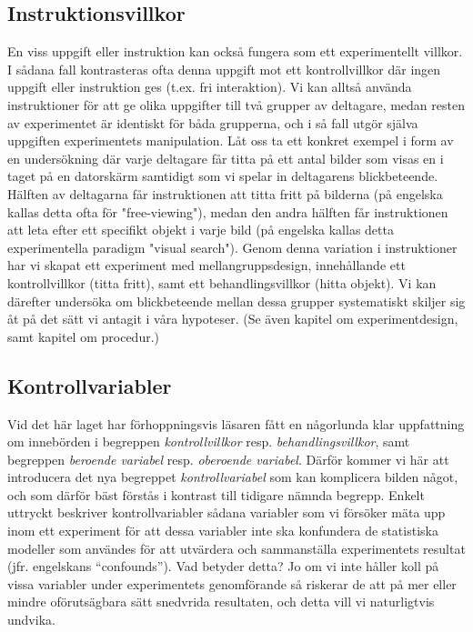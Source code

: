 \documentclass[
]{book}
\begin{document}
\hypertarget{sub07.4.3}{%
\subsection{Instruktionsvillkor}\label{sub07.4.3}}

En viss uppgift eller instruktion kan också fungera som ett experimentellt villkor. I sådana fall kontrasteras ofta denna uppgift mot ett kontrollvillkor där ingen uppgift eller instruktion ges (t.ex. fri interaktion). Vi kan alltså använda instruktioner för att ge olika uppgifter till två grupper av deltagare, medan resten av experimentet är identiskt för båda grupperna, och i så fall utgör själva uppgiften experimentets manipulation. Låt oss ta ett konkret exempel i form av en undersökning där varje deltagare får titta på ett antal bilder som visas en i taget på en datorskärm samtidigt som vi spelar in deltagarens blickbeteende. Hälften av deltagarna får instruktionen att titta fritt på bilderna (på engelska kallas detta ofta för "free-viewing"), medan den andra hälften får instruktionen att leta efter ett specifikt objekt i varje bild (på engelska kallas detta experimentella paradigm "visual search"). Genom denna variation i instruktioner har vi skapat ett experiment med mellangruppsdesign, innehållande ett kontrollvillkor (titta fritt), samt ett behandlingsvillkor (hitta objekt). Vi kan därefter undersöka om blickbeteende mellan dessa grupper systematiskt skiljer sig åt på det sätt vi antagit i våra hypoteser. (Se även kapitel om experimentdesign, samt kapitel om procedur.)

\hypertarget{sub07.4.4}{%
\subsection{Kontrollvariabler}\label{sub07.4.4}}

Vid det här laget har förhoppningsvis läsaren fått en någorlunda klar uppfattning om innebörden i begreppen \emph{kontrollvillkor} resp. \emph{behandlingsvillkor}, samt begreppen \emph{beroende variabel} resp. \emph{oberoende variabel}. Därför kommer vi här att introducera det nya begreppet \emph{kontrollvariabel} som kan komplicera bilden något, och som därför bäst förstås i kontrast till tidigare nämnda begrepp. Enkelt uttryckt beskriver kontrollvariabler sådana variabler som vi försöker mäta upp inom ett experiment för att dessa variabler inte ska konfundera de statistiska modeller som användes för att utvärdera och sammanställa experimentets resultat (jfr. engelskans ``confounds''). Vad betyder detta? Jo om vi inte håller koll på vissa variabler under experimentets genomförande så riskerar de att på mer eller mindre oförutsägbara sätt snedvrida resultaten, och detta vill vi naturligtvis undvika.
\end{document}
